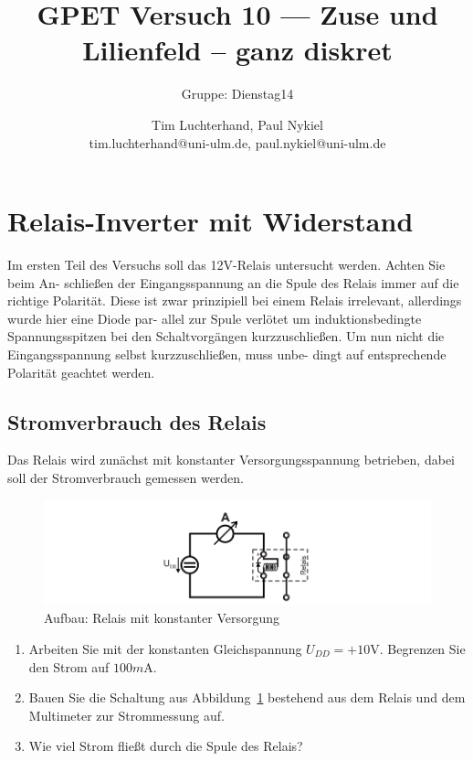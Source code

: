 \documentclass[10pt]{scrreprt}
\author{Tim Luchterhand, Paul Nykiel \protect\\ tim.luchterhand@uni-ulm.de, paul.nykiel@uni-ulm.de}
\title{GPET Versuch 10 --- Zuse und Lilienfeld – ganz diskret}
\subtitle{Gruppe: Dienstag14}
\begin{document}
    \maketitle

    \section{Relais-Inverter mit Widerstand}
    Im ersten Teil des Versuchs soll das 12V-Relais untersucht werden. Achten Sie beim An-
    schließen der Eingangsspannung an die Spule des Relais immer auf die richtige Polarität.
    Diese ist zwar prinzipiell bei einem Relais irrelevant, allerdings wurde hier eine Diode par-
    allel zur Spule verlötet um induktionsbedingte Spannungsspitzen bei den Schaltvorgängen
    kurzzuschließen. Um nun nicht die Eingangsspannung selbst kurzzuschließen, muss unbe-
    dingt auf entsprechende Polarität geachtet werden.

    \subsection{Stromverbrauch des Relais}
    Das Relais wird zunächst mit konstanter Versorgungsspannung betrieben, dabei soll der
    Stromverbrauch gemessen werden.
    \begin{figure}[H]
        \includegraphics[width=\textwidth]{abb11.png}
        \caption{Aufbau: Relais mit konstanter Versorgung}
        \label{fig:abb11}
    \end{figure}

    \begin{enumerate}
        \item Arbeiten Sie mit der konstanten Gleichspannung $U_{DD} = +10\si{\volt}$.
            Begrenzen Sie den Strom auf $100\si{m\ampere}$.
        \item Bauen Sie die Schaltung aus Abbildung~\ref{fig:abb11} bestehend aus dem Relais und dem
            Multimeter zur Strommessung auf.
        \item Wie viel Strom fließt durch die Spule des Relais?
    \end{enumerate}
\end{document}

